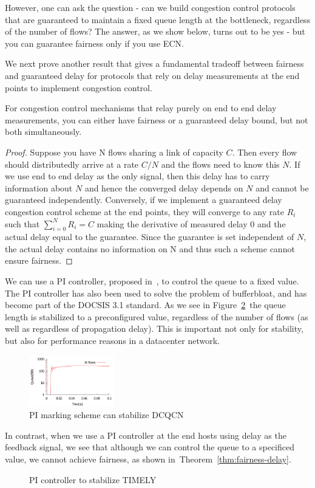 However, one can ask the question - can we build congestion control protocols
that are guaranteed to maintain a fixed queue length at the bottleneck,
regardless of the number of flows? The answer, as we show below, turns out to be
yes - but you can guarantee fairness only if you use ECN.

We next prove another result that gives a fundamental tradeoff between fairness
and guaranteed delay for protocols that rely on delay measurements at the end
points to implement congestion control.

\begin{thm}
\label{thm:fairness-delay}
For congestion control mechanisms that relay purely on end to end
delay measurements, you can either have fairness or a guaranteed delay
bound, but not both simultaneously.
\end{thm}
\begin{proof}
Suppose you have N flows sharing a link of capacity $C$. Then every flow
should distributedly arrive at a rate $C/N$ and the flows need to know
this $N$. If we use end to end delay as the only signal, then this delay
has to carry information about $N$ and hence the converged delay
depends on $N$ and cannot be guaranteed independently. Conversely, if we implement a guaranteed delay congestion
control scheme at the end points, they
will converge to any rate $R_i$ such that $\sum_{i=0}^{N}R_i = C$
making the derivative of measured delay 0 and the actual delay equal
to the guarantee. Since the guarantee is set independent of $N$, the
actual delay contains no information on N and 
thus such a scheme cannot ensure fairness.
\end{proof}

We can use a PI controller, proposed in~\cite{Hollot:PIController}, to
control the queue to a fixed value.  The PI
controller has also been used to solve the problem of bufferbloat, and
has become part of the DOCSIS 3.1 standard. As we see in
Figure~\ref{fig:dcqcn_pi}~the queue length is stabilized to a
preconfigured value, regardless of the number of flows (as well as
regardless of propagation delay). This is important not only for
stability, but also for performance reasons in a datacenter network.


\begin{figure}
\center
\includegraphics[width=0.33\textwidth]{figures/stable_q_85_pi.pdf}
\caption{PI marking scheme can stabilize DCQCN}
\label{fig:dcqcn_pi}
\end{figure}

In contrast, when we use a PI controller at the end hosts using delay
as the feedback signal, we see that although we can control the queue
to a specificed value, we cannot achieve fairness, as shown
in~Theorem~\ref{thm:fairness-delay}.
\begin{figure}
\center
\caption{PI controller to stabilize TIMELY}
\label{fig:dcqcn_pi}
\end{figure}
